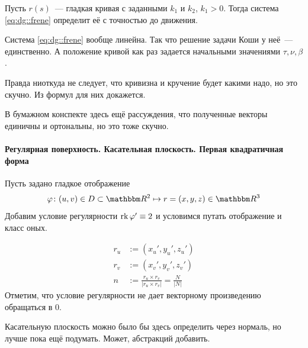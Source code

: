 \documentclass[draft,timbord]{longnotes}
\begin{document}
\begin{thrm}\label{thrm:dg::frene::reconst}
  Пусть $r(s)$~--- гладкая кривая с заданными $k_1$ и $k_2$, $k_1>0$. 
  Тогда система \eqref{eq:dg::frene} определит её с точностью до движения.
\end{thrm}

\begin{tproof}
  Система \eqref{eq:dg::frene} вообще линейна. Так что решение задачи Коши у неё~--- единственно.
  А положение кривой как раз задается начальными значениями $\tau , \nu , \beta $.

  Правда ниоткуда не следует, что кривизна и кручение будет какими надо, но это скучно.
  Из формул для них докажется.
\end{tproof}

В бумажном конспекте здесь ещё рассуждения, что полученные векторы единичны и ортональны, но 
это тоже скучно.

\paragraph{Регулярная поверхность. Касательная плоскость. Первая квадратичная форма}
\label{par:dg::tangplane}

\begin{defn}\label{defn:dg::tangplane::manifold}
  Пусть задано гладкое отображение \[
    \varphi \colon (u,v) \in D \subset \R^2 \mapsto r=(x,y,z) \in \R^3
  \]
  Добавим условие регулярности $\operatorname{rk} \varphi' \equiv 2$ и условимся путать отображение и класс 
  оных.
\end{defn}

\begin{defn}\label{defn:dg::tangplane::tanv}
  \[
    \begin{split}
      r_u &:= (x_u', y_u', z_u') \\
      r_v &:= (x_v', y_v', z_v') \\
      n &:= \frac{r_u \times r_v}{|r_u \times r_v|} = \frac{N}{|N|} 
    \end{split}
  \]
  Отметим, что условие регулярности не дает векторному произведению обращаться в 0.
  
  Касательную плоскость можно было бы здесь определить через нормаль, но лучше пока ещё подумать.
  Может, абстракций добавить.
\end{defn}
\end{document}
